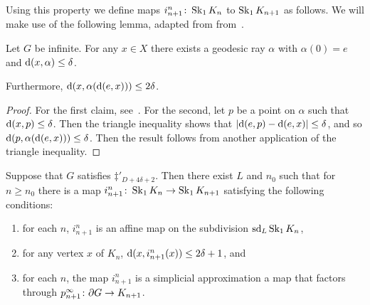 \documentclass[a4paper]{article}
\begin{document}
Using this property we define maps $i^n_{n+1}\colon \operatorname{Sk}_1 K_n$ to
$\operatorname{Sk}_1K_{n+1}$ as follows.  We will make use of the following lemma, adapted
from from~\cite{bestvinamess91}.

\begin{lemma}\cite{bestvinamess91}\label{lem:near_geod_rays}
  Let $G$ be infinite. For any $x \in X$ there exists a geodesic ray $\alpha$ 
  with $\alpha(0) = e$ and $\operatorname{d}(x,\alpha) \leq \delta$. 
  
  Furthermore, $\operatorname{d}(x, \alpha(\operatorname{d}(e,x))) \leq 2\delta$.
\end{lemma}

\begin{proof}
  For the first claim, see~\cite{bestvinamess91}. For the second, let $p$ be a 
  point on $\alpha$ such that $\operatorname{d}(x, p) \leq \delta$. Then the triangle 
  inequality shows that $\left|\operatorname{d}(e,p) - \operatorname{d}(e,x)\right| \leq \delta$, and 
  so $\operatorname{d}(p, \alpha(\operatorname{d}(e,x))) \leq \delta$. Then the result 
  follows from another application of the triangle inequality.
\end{proof}

\begin{proposition}\label{prop:i_in_dimension_1}
  Suppose that $G$ satisfies $\ddag'_{D + 4\delta+2}$. Then there exist $L$ and
  $n_0$ such that for $n\geq n_0$ there is a map $i^n_{n+1}\colon \operatorname{Sk}_1 K_n
  \to \operatorname{Sk}_1 K_{n+1}$ satisfying the following conditions:
  \begin{enumerate}
    \item for each $n$, $i^n_{n+1}$ is an affine map on the subdivision
      $\operatorname{sd}_L\operatorname{Sk}_1 K_n$,
    \item for any vertex $x$ of $K_n$, $\operatorname{d}(x, i^n_{n+1}(x)) \leq 2\delta+1$,
      and
    \item for each $n$, the map $i^n_{n+1}$ is a simplicial approximation a map
      that factors through $p^\infty_{n+1}\colon \partial G \to K_{n+1}$.
  \end{enumerate}
\end{proposition}
\end{document}
